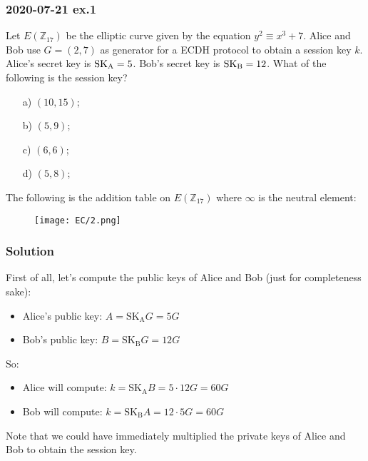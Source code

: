 \subsubsection{2020-07-21 ex.1}
Let $E(\mathbb{Z}_{17})$ be the elliptic curve given by the equation $y^2\equiv x^3+7$. Alice and Bob use $G=(2,7)$ as generator for a ECDH protocol to obtain a session key $k$. Alice's secret key is $\text{SK}_{\text A}=5$. Bob's secret key is $\text{SK}_{\text B}=12$. What of the following is the session key?
\begin{itemize}
    \item[a)] $(10,15)$;
    \item[b)] $(5,9)$;
    \item[c)] $(6,6)$;
    \item[d)] $(5,8)$;
\end{itemize}
The following is the addition table on $E(\mathbb{Z}_{17})$ where $\infty$ is the neutral element:
\begin{figure}[H]
    \centering
    \texttt{[image: EC/2.png]}
\end{figure}

\subsubsection*{Solution}
First of all, let's compute the public keys of Alice and Bob (just for completeness sake):
\begin{itemize}
    \item Alice's public key: $A=\text{SK}_{\text{A}}G=5G$
    \item Bob's public key: $B=\text{SK}_{\text{B}}G=12G$
\end{itemize}
So:
\begin{itemize}
    \item Alice will compute: $k=\text{SK}_{\text{A}}B=5\cdot12G=60G$
    \item Bob will compute: $k=\text{SK}_{\text{B}}A=12\cdot5G=60G$
\end{itemize}
Note that we could have immediately multiplied the private keys of Alice and Bob to obtain the session key.

